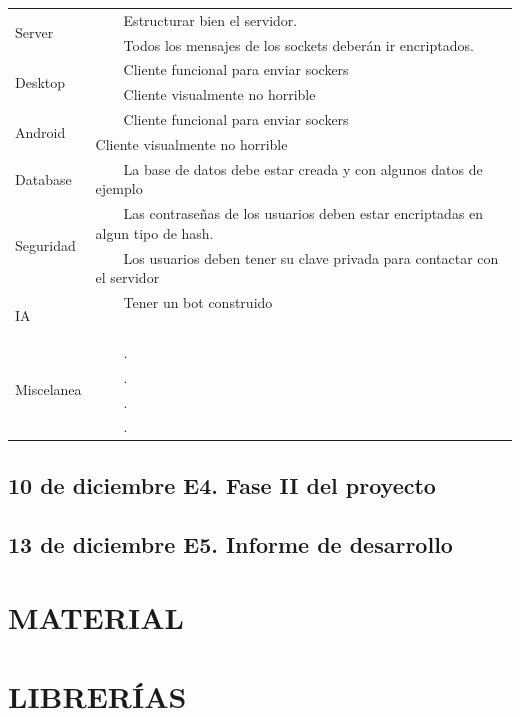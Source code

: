 \documentclass{article}
\newcommand{\tabitem}{~~\llap{\textbullet}~~}
\theoremstyle{definition}
\begin{document}
\begin{tabular}{|p{3cm}|p{11cm}|}
\hline
\multirow{2}{*}{Server} & \tabitem Estructurar bien el servidor.\\
& \tabitem Todos los mensajes de los sockets deberán ir encriptados.\\
\hline
\multirow{2}{*}{Desktop} & \tabitem Cliente funcional para enviar sockers\\
& \tabitem Cliente visualmente no horrible \\
\hline  
 \multirow{2}{*}{Android} & \tabitem Cliente funcional para enviar sockers \\
 & Cliente visualmente no horrible \\
\hline 
 Database & \tabitem  La base de datos debe estar creada y con algunos datos de ejemplo \\
 \hline 
 \multirow{2}{*}{Seguridad} & \tabitem Las contraseñas de los usuarios deben estar encriptadas en algun tipo de hash. \\
 & \tabitem Los usuarios deben tener su clave privada para contactar con el servidor\\
 \hline 
 \multirow{2}{*}{IA} & \tabitem Tener un bot construido \\
 &  \tabitem \\
 \hline 
 \multirow{4}{*}{Miscelanea} & \tabitem  . \\
 & \tabitem . \\
 & \tabitem .\\
 & \tabitem .\\
\hline
\end{tabular}

\subsection{10 de diciembre	E4. Fase II del proyecto}
\subsection{13 de diciembre	E5. Informe de desarrollo}




\section{MATERIAL}

\section{LIBRERÍAS}
\end{document}
